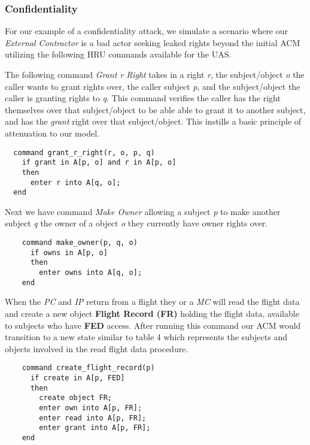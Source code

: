 \documentclass[10pt,journal,compsoc]{IEEEtran}
\begin{document}
  \subsubsection{Confidentiality}

  For our example of a confidentiality attack, we simulate a scenario where our \textit{External Contractor} is a bad actor seeking leaked rights beyond the initial ACM utilizing the following HRU commands available for the UAS.

  The following command \textit{Grant r Right} takes in a right \textit{r}, the subject/object \textit{o} the caller wants to grant rights over, the caller subject \textit{p}, and the subject/object the caller is granting rights to \textit{q}.
  This command verifies the caller has the right themselves over that subject/object to be able able to grant it to another subject, and has the \textit{grant} right over that subject/object. This instills a basic principle of attenuation to our model. 
  
  \begin{lstlisting}
  command grant_r_right(r, o, p, q)
    if grant in A[p, o] and r in A[p, o]
    then
      enter r into A[q, o];
  end
  \end{lstlisting}
  
  Next we have command \textit{Make Owner} allowing a subject \textit{p} to make another subject \textit{q} the owner of a object \textit{o} they currently have owner rights over. 

  \begin{lstlisting}
    command make_owner(p, q, o)
      if owns in A[p, o]
      then
        enter owns into A[q, o];
    end
  \end{lstlisting}

  When the \textit{PC} and \textit{IP} return from a flight they or a \textit{MC} will read the flight data and create a new object \textbf{Flight Record (FR)} holding the flight data, available to subjects who have \textbf{FED} access. After running this command our ACM would transition to a new state similar to table 4 which represents the subjects and objects involved in the read flight data procedure. 

  \begin{lstlisting}
    command create_flight_record(p)
      if create in A[p, FED]
      then
        create object FR;
        enter own into A[p, FR];
        enter read into A[p, FR];
        enter grant into A[p, FR];
    end
  \end{lstlisting}
\end{document}
